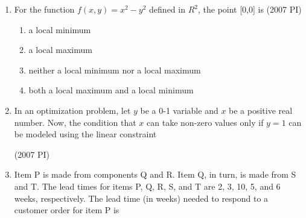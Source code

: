 \begin{enumerate}[label=\thesubsection.\arabic*,ref=\thesubsection.\theenumi]
            \hfill (2007 PI)
            \begin{enumerate}
            \end{enumerate}
            \item 
                 For the function $f(x,y)=x^{2} -y^{2}$ defined in  $R^{2}$, the point [0,0] is
                 \hfill (2007 PI)
                 \begin{enumerate}
                \item a local minimum
                \item a local maximum
                \item neither a local minimum nor a local    maximum
                \item both a local maximum and a local minimum
                 \end{enumerate}
    \item 
In an optimization problem, let $y$ be a 0-1 variable and $x$ be a positive real number. Now, the condition that $x$ can take non-zero values only if $y = 1$ can be modeled using the linear constraint

\hfill (2007 PI)

\begin{enumerate}
\end{enumerate}

\item 
Item P is made from components Q and R. Item Q, in turn, is made from S and T. The lead times for items P, Q, R, S, and T are 2, 3, 10, 5, and 6 weeks, respectively. The lead time (in weeks) needed to respond to a customer order for item P is


\end{enumerate}

